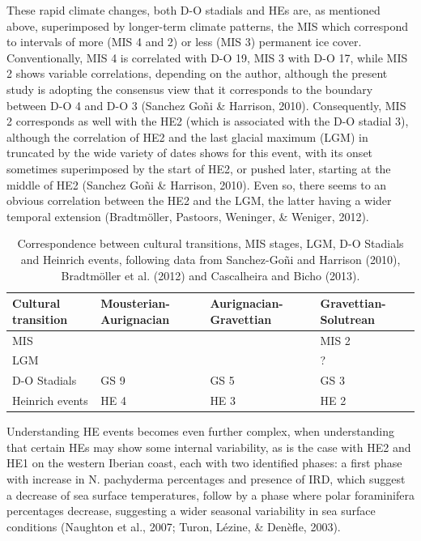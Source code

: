 \documentclass[12pt,twoside]{reedthesis}
\begin{document}
These rapid climate changes, both D-O stadials and HEs are, as mentioned above, superimposed by longer-term climate patterns, the MIS which correspond to intervals of more (MIS 4 and 2) or less (MIS 3) permanent ice cover. Conventionally, MIS 4 is correlated with D-O 19, MIS 3 with D-O 17, while MIS 2 shows variable correlations, depending on the author, although the present study is adopting the consensus view that it corresponds to the boundary between D-O 4 and D-O 3 (Sanchez Goñi \& Harrison, 2010). Consequently, MIS 2 corresponds as well with the HE2 (which is associated with the D-O stadial 3), although the correlation of HE2 and the last glacial maximum (LGM) in truncated by the wide variety of dates shows for this event, with its onset sometimes superimposed by the start of HE2, or pushed later, starting at the middle of HE2 (Sanchez Goñi \& Harrison, 2010). Even so, there seems to an obvious correlation between the HE2 and the LGM, the latter having a wider temporal extension (Bradtmöller, Pastoors, Weninger, \& Weniger, 2012).
\begin{table}

\caption{\label{tab:unnamed-chunk-1}Correspondence between cultural transitions, MIS stages, LGM, D-O Stadials and Heinrich events, following data from Sanchez-Goñi and Harrison (2010), Bradtmöller et al. (2012) and Cascalheira and Bicho (2013).}
\centering
\begin{tabular}[t]{llll}
\toprule
Cultural transition & Mousterian-Aurignacian & Aurignacian-Gravettian & Gravettian-Solutrean\\
\midrule
MIS &  &  & MIS 2\\
LGM &  &  & ?\\
D-O Stadials & GS 9 & GS 5 & GS 3\\
Heinrich events & HE 4 & HE 3 & HE 2\\
\bottomrule
\end{tabular}
\end{table}
Understanding HE events becomes even further complex, when understanding that certain HEs may show some internal variability, as is the case with HE2 and HE1 on the western Iberian coast, each with two identified phases: a first phase with increase in N. pachyderma percentages and presence of IRD, which suggest a decrease of sea surface temperatures, follow by a phase where polar foraminifera percentages decrease, suggesting a wider seasonal variability in sea surface conditions (Naughton et al., 2007; Turon, Lézine, \& Denèfle, 2003).
\end{document}
